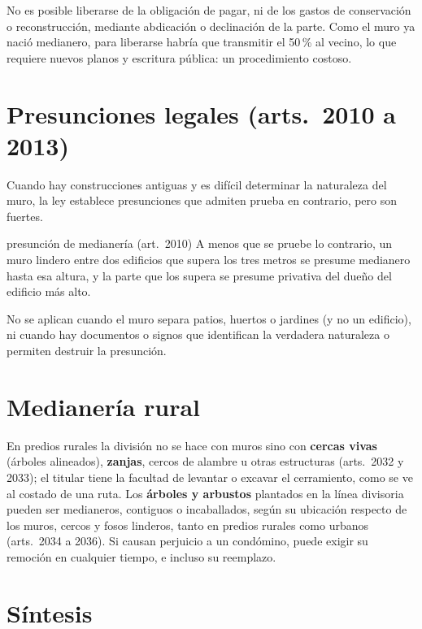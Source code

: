 \documentclass[12pt,oneside]{book}
\begin{document}
No es posible liberarse de la obligación de pagar, ni de los gastos de conservación o reconstrucción, mediante abdicación o declinación de la parte. Como el muro ya nació medianero, para liberarse habría que transmitir el 50\,\% al vecino, lo que requiere nuevos planos y escritura pública: un procedimiento costoso.

\section{Presunciones legales (arts.~2010 a 2013)}

Cuando hay construcciones antiguas y es difícil determinar la naturaleza del muro, la ley establece presunciones que admiten prueba en contrario, pero son fuertes.

\begin{definicion}{presunción de medianería (art.~2010)}
A menos que se pruebe lo contrario, un muro lindero entre dos edificios que supera los tres metros se presume medianero hasta esa altura, y la parte que los supera se presume privativa del dueño del edificio más alto.
\end{definicion}

No se aplican cuando el muro separa patios, huertos o jardines (y no un edificio), ni cuando hay documentos o signos que identifican la verdadera naturaleza o permiten destruir la presunción.

\section{Medianería rural}

En predios rurales la división no se hace con muros sino con \textbf{cercas vivas} (árboles alineados), \textbf{zanjas}, cercos de alambre u otras estructuras (arts.~2032 y 2033); el titular tiene la facultad de levantar o excavar el cerramiento, como se ve al costado de una ruta. Los \textbf{árboles y arbustos} plantados en la línea divisoria pueden ser medianeros, contiguos o incaballados, según su ubicación respecto de los muros, cercos y fosos linderos, tanto en predios rurales como urbanos (arts.~2034 a 2036). Si causan perjuicio a un condómino, puede exigir su remoción en cualquier tiempo, e incluso su reemplazo. %

\section{Síntesis}
\end{document}
